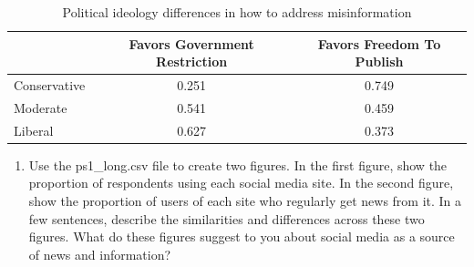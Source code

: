 \documentclass[
  letterpaper,
  DIV=11,
  numbers=noendperiod]{scrartcl}
\newenvironment{Shaded}{\begin{snugshade}}{\end{snugshade}}
\newcommand{\AttributeTok}[1]{\textcolor[rgb]{0.40,0.45,0.13}{#1}}
\newcommand{\ConstantTok}[1]{\textcolor[rgb]{0.56,0.35,0.01}{#1}}
\newcommand{\DecValTok}[1]{\textcolor[rgb]{0.68,0.00,0.00}{#1}}
\newcommand{\FunctionTok}[1]{\textcolor[rgb]{0.28,0.35,0.67}{#1}}
\newcommand{\NormalTok}[1]{\textcolor[rgb]{0.00,0.23,0.31}{#1}}
\newcommand{\SpecialCharTok}[1]{\textcolor[rgb]{0.37,0.37,0.37}{#1}}
\newcommand{\StringTok}[1]{\textcolor[rgb]{0.13,0.47,0.30}{#1}}
\providecommand{\tightlist}{%
  \setlength{\itemsep}{0pt}\setlength{\parskip}{0pt}}\usepackage{longtable,booktabs,array}
\begin{document}
\begin{Shaded}
\end{Shaded}

\begin{table}[!h]

\caption{Political ideology differences in how to address misinformation}
\centering
\begin{tabular}[t]{lcc}
\toprule
  & Favors Government Restriction & Favors Freedom To Publish\\
\midrule
Conservative & 0.251 & 0.749\\
Moderate & 0.541 & 0.459\\
Liberal & 0.627 & 0.373\\
\bottomrule
\end{tabular}
\end{table}

\begin{enumerate}
\def\labelenumi{\arabic{enumi}.}
\setcounter{enumi}{4}
\tightlist
\item
  Use the ps1\_long.csv file to create two figures. In the first figure,
  show the proportion of respondents using each social media site. In
  the second figure, show the proportion of users of each site who
  regularly get news from it. In a few sentences, describe the
  similarities and differences across these two figures. What do these
  figures suggest to you about social media as a source of news and
  information?
\end{enumerate}
\end{document}

